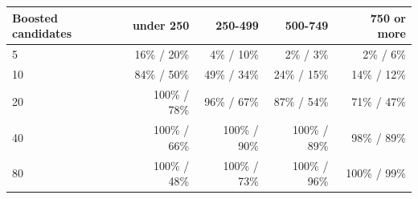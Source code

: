 {\small
\begin{tabular}{lrrrr}
\toprule
Boosted candidates & under 250 & 250-499 & 500-749 & 750 or more \\
\midrule
5 & 16\% / 20\% & 4\% / 10\% & 2\% / 3\% & 2\% / 6\% \\
10 & 84\% / 50\% & 49\% / 34\% & 24\% / 15\% & 14\% / 12\% \\
20 & 100\% / 78\% & 96\% / 67\% & 87\% / 54\% & 71\% / 47\% \\
40 & 100\% / 66\% & 100\% / 90\% & 100\% / 89\% & 98\% / 89\% \\
80 & 100\% / 48\% & 100\% / 73\% & 100\% / 96\% & 100\% / 99\% \\
\bottomrule
\end{tabular}}
